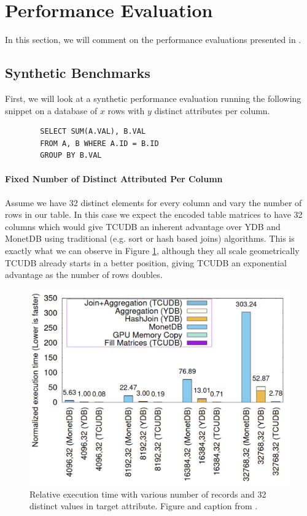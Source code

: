 \documentclass{paper}
\begin{document}
	\section{Performance Evaluation} \label{sec:perf_eval}
	In this section, we will comment on the performance evaluations presented in \cite{hu2021tcudb}.
	
	\subsection{Synthetic Benchmarks}
	
	First, we will look at a synthetic performance evaluation running the following snippet on a database of $x$ rows with $y$ distinct attributes per column.
	\begin{verbatim}
		SELECT SUM(A.VAL), B.VAL
		FROM A, B WHERE A.ID = B.ID
		GROUP BY B.VAL
	\end{verbatim}
	
	\paragraph{Fixed Number of Distinct Attributed Per Column}
	Assume we have 32 distinct elements for every column and vary the number of rows in our table.
	In this case we expect the encoded table matrices to have 32 columns which would give TCUDB an inherent advantage over YDB and MonetDB using traditional (e.g. sort or hash based joins) algorithms. This is exactly what we can observe in Figure \ref{fig:bench1}, although they all scale geometrically TCUDB already starts in a better position, giving TCUDB an exponential advantage as the number of rows doubles. 
	\begin{figure}
		\centering
		\includegraphics[width=0.9\linewidth]{bench1}
		\caption{Relative execution time with various number of records and 32 distinct values in target attribute. Figure and caption from \cite{hu2021tcudb}.}
		\label{fig:bench1}
	\end{figure}
	
\end{document}

